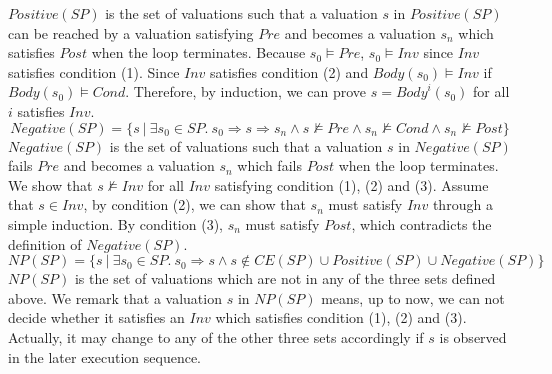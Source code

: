 $\mathit{Positive}(\mathit{SP})$ is the set of valuations such that a valuation $s$ in $\mathit{Positive}(\mathit{SP})$ can be reached by a valuation satisfying $Pre$ and becomes a valuation $s_n$ which satisfies $Post$ when the loop terminates. 
Because $s_0 \models \mathit{Pre}$, $s_0 \models \mathit{Inv}$ since $\mathit{Inv}$ satisfies condition (1). 
Since $\mathit{Inv}$ satisfies condition (2) and $\mathit{Body}(s_0) \models \mathit{Inv}$ if $\mathit{Body}(s_0) \models \mathit{Cond}$.
Therefore, by induction, we can prove $s = \mathit{Body}^i(s_0)$ for all $i$ satisfies $\mathit{Inv}$.
 \[
    \mathit{Negative}(\mathit{SP}) = \{s~|~\exists s_0 \in \mathit{SP}.~s_0 \Rightarrow s \Rightarrow s_n \land s \not \models \mathit{Pre} \land s_n \not \models \mathit{Cond} \land s_n \not \models \mathit{Post}\} \]
$\mathit{Negative}(\mathit{SP})$ is the set of valuations such that a valuation $s$ in $\mathit{Negative}(\mathit{SP})$ fails $\mathit{Pre}$ and becomes a valuation $s_n$ which fails $\mathit{Post}$ when the loop terminates. We show that $s \not \models \mathit{Inv}$ for all $\mathit{Inv}$ satisfying condition (1), (2) and (3). Assume that $s \in \mathit{Inv}$, by condition (2), we can show that $s_n$ must satisfy $\mathit{Inv}$ through a simple induction. By condition (3), $s_n$ must satisfy $\mathit{Post}$, which contradicts the definition of $\mathit{Negative}(\mathit{SP})$.
\[    \mathit{NP}(\mathit{SP}) = \{s~|~\exists s_0 \in \mathit{SP}.~ s_0 \Rightarrow s \land s \not \in \mathit{CE(SP)} \cup \mathit{Positive(SP)} \cup \mathit{Negative(SP)}\}
\]
$\mathit{NP(SP)}$ is the set of valuations which are not in any of the three sets defined above. 
We remark that a valuation $s$ in $\mathit{NP(SP)}$ means, up to now, we can not decide whether it satisfies an $\mathit{Inv}$ which satisfies condition (1), (2) and (3).
Actually, it may change to any of the other three sets accordingly if $s$ is observed in the later execution sequence.

